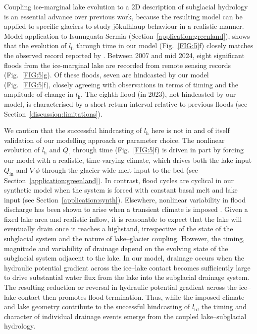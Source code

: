 \documentclass[tc, manuscript]{copernicus}
\begin{document}
Coupling ice-marginal lake evolution to a 2D description of subglacial hydrology is an essential advance over previous work, because the resulting model can be applied to specific glaciers to study jökulhlaup behaviour in a realistic manner. Model application to Isunnguata Sermia (Section~\ref{application:greenland}), shows that the evolution of $l_{\mathrm{h}}$ through time in our model (Fig.~\ref{FIG:5}f) closely matches the observed record reported by \citet[][Fig.~\ref{FIG:5},g]{livingstone2025ice}. Between 2007 and mid 2024, eight significant floods from the ice-marginal lake are recorded from remote sensing records (Fig.~\ref{FIG:5}g). Of these floods, seven are hindcasted by our model (Fig.~\ref{FIG:5}f), closely agreeing with observations in terms of timing and the amplitude of change in $l_{\mathrm{h}}$. The eighth flood (in 2023), not hindcasted by our model, is characterised by a short return interval relative to previous floods (see Section~\ref{discussion:limitations}).

We caution that the successful hindcasting of $l_{\mathrm{h}}$ here is not in and of itself validation of our modelling approach or parameter choice. The nonlinear evolution of $l_{\mathrm{h}}$ and $Q_{\mathrm{r}}$ through time (Fig.~\ref{FIG:5}f) is driven in part by forcing our model with a realistic, time-varying climate, which drives both the lake input $Q_{\mathrm{in}}$ and $\nabla \phi$ through the glacier-wide melt input to the bed (see Section~\ref{application:greenland}). In contrast, flood cycles are cyclical in our synthetic model when the system is forced with constant basal melt and lake input (see Section~\ref{application:synth}). Elsewhere, nonlinear variability in flood discharge has been shown to arise when a transient climate is imposed \citep{kingslake2015chaotic, ng2009temporal}. Given a fixed lake area and realistic inflow, it is reasonable to expect that the lake will eventually drain once it reaches a highstand, irrespective of the state of the subglacial system and the nature of lake--glacier coupling. However, the timing, magnitude and variability of drainage depend on the evolving state of the subglacial system adjacent to the lake. In our model, drainage occurs when the hydraulic potential gradient across the ice--lake contact becomes sufficiently large to drive substantial water flux from the lake into the subglacial drainage system. The resulting reduction or reversal in hydraulic potential gradient across the ice--lake contact then promotes flood termination. Thus, while the imposed climate and lake geometry contribute to the successful hindcasting of $l_{\mathrm{h}}$, the timing and character of individual drainage events emerge from the coupled lake--subglacial hydrology.
\end{document}
